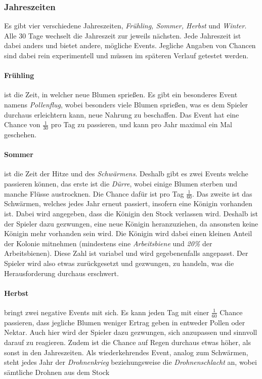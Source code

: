 \subsubsection{Jahreszeiten}
Es gibt vier verschiedene Jahreszeiten, \textit{Frühling, Sommer, Herbst} und \textit{Winter}. Alle 30 Tage wechselt die Jahreszeit zur jeweils nächsten. Jede Jahreszeit ist dabei anders und bietet andere, mögliche Events. Jegliche Angaben von Chancen sind dabei rein experimentell und müssen im späteren Verlauf getestet werden.

\paragraph{Frühling} ist die Zeit, in welcher neue Blumen sprießen. Es gibt ein besonderes Event namens \textit{Pollenflug}, wobei besonders viele Blumen sprießen, was es dem Spieler durchaus erleichtern kann, neue Nahrung zu beschaffen. Das Event hat eine Chance von $\frac{1}{30}$ pro Tag zu passieren, und kann pro Jahr maximal ein Mal geschehen.

\paragraph{Sommer} ist die Zeit der Hitze und des \textit{Schwärmens}. Deshalb gibt es zwei Events welche passieren können, das erste ist die \textit{Dürre}, wobei einige Blumen sterben und manche Flüsse austrocknen. Die Chance dafür ist pro Tag $\frac{1}{60}$. Das zweite ist das Schwärmen, welches jedes Jahr erneut passiert, insofern eine Königin vorhanden ist. Dabei wird angegeben, dass die Königin den Stock verlassen wird. Deshalb ist der Spieler dazu gezwungen, eine neue Königin heranzuziehen, da ansonsten keine Königin mehr vorhanden sein wird. Die Königin wird dabei einen kleinen Anteil der Kolonie mitnehmen (mindestens eine \textit{Arbeitsbiene} und \textit{20\%} der Arbeitsbienen). Diese Zahl ist variabel und wird gegebenenfalls angepasst. Der Spieler wird also etwas zurückgesetzt und gezwungen, zu handeln, was die Herausforderung durchaus erschwert. 

\paragraph{Herbst} bringt zwei negative Events mit sich. Es kann jeden Tag mit einer $\frac{1}{60}$ Chance passieren, dass jegliche Blumen weniger Ertrag geben in entweder Pollen oder Nektar. Auch hier wird der Spieler dazu gezwungen, sich anzupassen und sinnvoll darauf zu reagieren. Zudem ist die Chance auf Regen durchaus etwas höher, als sonst in den Jahreszeiten. Als wiederkehrendes Event, analog zum Schwärmen, steht jedes Jahr der \textit{Drohnenkrieg} beziehungsweise die \textit{Drohnenschlacht} an, wobei sämtliche Drohnen aus dem Stock 

